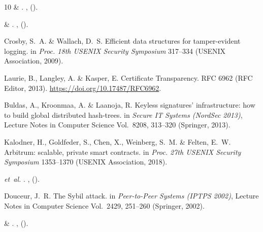 \documentclass[lineno,pdflatex,sn-nature]{sn-jnl}
\theoremstyle{thmstyleone}%
\theoremstyle{thmstylethree}%
\begin{document}
\begin{thebibliography}{10}
 \& 
\newblock {}.
\newblock \emph{} \textbf{},
   ().

 \& 
\newblock {}.
\newblock \emph{}
  \textbf{}, 
  ().

Crosby, S.~A. \& Wallach, D.~S. Efficient data structures for tamper-evident logging. in \emph{Proc. 18th USENIX Security Symposium} 317--334 (USENIX Association, 2009).

Laurie, B., Langley, A. \& Kasper, E. Certificate Transparency. RFC 6962 (RFC Editor, 2013). \url{https://doi.org/10.17487/RFC6962}.

Buldas, A., Kroonmaa, A. \& Laanoja, R. Keyless signatures' infrastructure: how to build global distributed hash-trees. in \emph{Secure IT Systems (NordSec 2013)}, Lecture Notes in Computer Science Vol.~8208, 313--320 (Springer, 2013).

Kalodner, H., Goldfeder, S., Chen, X., Weinberg, S.~M. \& Felten, E.~W. Arbitrum: scalable, private smart contracts. in \emph{Proc. 27th USENIX Security Symposium} 1353--1370 (USENIX Association, 2018).

 \emph{et~al.}
\newblock {}.
\newblock \emph{}
  \textbf{}, 
  ().

Douceur, J.~R. The {Sybil} attack. in \emph{Peer-to-Peer Systems (IPTPS 2002)}, Lecture Notes in Computer Science Vol.~2429, 251--260 (Springer, 2002).

 \& 
\newblock {}.
\newblock \emph{}
  \textbf{}, 
  ().


\end{thebibliography}
\end{document}

